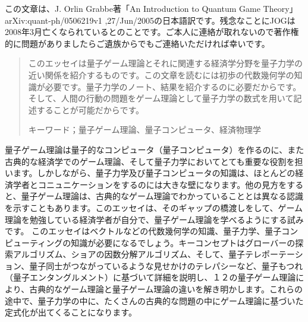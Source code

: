 この文章は、J. Orlin Grabbe著「An Introduction to Quantum Game Theory」arXiv:quant-ph/0506219v1 ,27/Jun/2005の日本語訳です。残念なことにJOGは2008年3月亡くなられているとのことです。ご本人に連絡が取れないので著作権的に問題がありましたらご遺族からでもご連絡いただければ幸いです。

\begin{abstract}

このエッセイは量子ゲーム理論とそれに関連する経済学分野を量子力学の近い関係を紹介するものです。この文章を読むには初歩の代数幾何学の知識が必要です。量子力学のノート、結果を紹介するのに必要だからです。そして、人間の行動の問題をゲーム理論として量子力学の数式を用いて記述することが可能だからです。

キーワード；量子ゲーム理論、量子コンピュータ、経済物理学
\end{abstract}

量子ゲーム理論は量子的なコンピュータ（量子コンピュータ）を作るのに、また古典的な経済学でのゲーム理論、そして量子力学においてとても重要な役割を担います。しかしながら、量子力学及び量子コンピュータの知識は、ほとんどの経済学者とコニュニケーションをするのには大きな壁になります。他の見方をすると、量子ゲーム理論は、古典的なゲーム理論でわかっていることとは異なる認識を示すこともあります。このエッセイは、そのギャップの橋渡しをして、ゲーム理論を勉強している経済学者が自分で、量子ゲーム理論を学べるようにする試みです。
このエッセイはベクトルなどの代数幾何学の知識、量子力学、量子コンピューティングの知識が必要になるでしょう。キーコンセプトはグローバーの探索アルゴリズム、ショアの因数分解アルゴリズム、そして、量子テレポーテーション、量子同士がつながっているような見せかけのテレパシーなど、量子もつれ（量子エンタングルメント）に基づいて詳細を説明し、１２の量子ゲーム理論により、古典的なゲーム理論と量子ゲーム理論の違いを解き明かします。これらの途中で、量子力学の中に、たくさんの古典的な問題の中にゲーム理論に基づいた定式化が出てくることになります。

